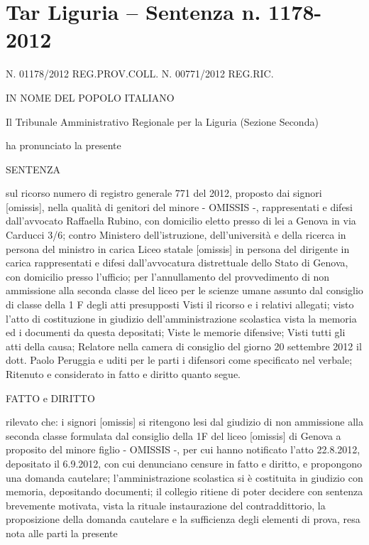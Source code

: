 \chapter{Tar Liguria – Sentenza n. 1178-2012}
\label{cha:TarLiguriaSentenza1178_2012}
N. 01178/2012 REG.PROV.COLL.
N. 00771/2012 REG.RIC.
\begin{center}
IN NOME DEL POPOLO ITALIANO
	
	Il Tribunale Amministrativo Regionale per la Liguria
	(Sezione Seconda)
	
	ha pronunciato la presente
	
	SENTENZA
\end{center}
sul ricorso numero di registro generale 771 del 2012, proposto dai signori [omissis],
nella qualità di genitori del minore - OMISSIS -, rappresentati e difesi dall'avvocato
Raffaella Rubino, con domicilio eletto presso di lei a Genova in via Carducci 3/6;
contro
Ministero dell'istruzione, dell'università e della ricerca in persona del ministro in
carica
Liceo statale
[omissis]
in persona del dirigente in carica rappresentati e difesi dall'avvocatura distrettuale dello Stato di Genova, con
domicilio presso l'ufficio; per l'annullamento
del provvedimento di non ammissione alla seconda classe del liceo per le scienze umane assunto dal consiglio di classe della 1 F
degli atti presupposti
Visti il ricorso e i relativi allegati;
visto l'atto di costituzione in giudizio dell'amministrazione scolastica
vista la memoria ed i documenti da questa depositati;
Viste le memorie difensive;
Visti tutti gli atti della causa;
Relatore nella camera di consiglio del giorno 20 settembre 2012 il dott. Paolo
Peruggia e uditi per le parti i difensori come specificato nel verbale;
Ritenuto e considerato in fatto e diritto quanto segue.
\begin{center}
FATTO e DIRITTO
\end{center}
rilevato che: i signori [omissis] si ritengono lesi dal giudizio di non ammissione alla seconda classe formulata dal consiglio della 1F del liceo [omissis] di Genova a proposito del minore figlio - OMISSIS -, per cui hanno notificato l'atto 22.8.2012, depositato il
6.9.2012, con cui denunciano censure in fatto e diritto, e propongono una domanda cautelare;
l'amministrazione scolastica si è costituita in giudizio con memoria, depositando documenti;
il collegio ritiene di poter decidere con sentenza brevemente motivata, vista la rituale instaurazione del contraddittorio, la proposizione della domanda cautelare e la sufficienza degli elementi di prova, resa nota alle parti la presente
